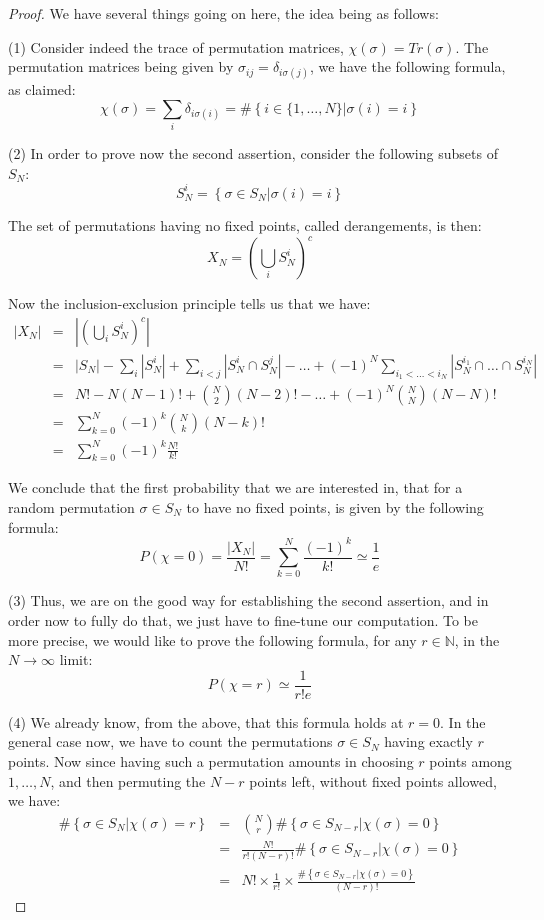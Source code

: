 \documentclass[12pt]{amsbook}
\begin{document}
\begin{proof}
We have several things going on here, the idea being as follows:

\medskip

(1) Consider indeed the trace of permutation matrices, $\chi(\sigma)=Tr(\sigma)$. The permutation matrices being given by $\sigma_{ij}=\delta_{i\sigma(j)}$, we have the following formula, as claimed:
$$\chi(\sigma)
=\sum_i\delta_{i\sigma(i)}
=\#\left\{i\in\{1,\ldots,N\}\Big|\sigma(i)=i\right\}$$

(2) In order to prove now the second assertion, consider the following subsets of $S_N$:
$$S_N^i=\left\{\sigma\in S_N\Big|\sigma(i)=i\right\}$$

The set of permutations having no fixed points, called derangements, is then:
$$X_N=\left(\bigcup_iS_N^i\right)^c$$

Now the inclusion-exclusion principle tells us that we have:
\begin{eqnarray*}
|X_N|
&=&\left|\left(\bigcup_iS_N^i\right)^c\right|\\
&=&|S_N|-\sum_i|S_N^i|+\sum_{i<j}|S_N^i\cap S_N^j|-\ldots+(-1)^N\sum_{i_1<\ldots<i_N}|S_N^{i_1}\cap\ldots\cap S_N^{i_N}|\\
&=&N!-N(N-1)!+\binom{N}{2}(N-2)!-\ldots+(-1)^N\binom{N}{N}(N-N)!\\
&=&\sum_{k=0}^N(-1)^k\binom{N}{k}(N-k)!\\
&=&\sum_{k=0}^N(-1)^k\frac{N!}{k!}
\end{eqnarray*}

We conclude that the first probability that we are interested in, that for a random permutation $\sigma\in S_N$ to have no fixed points, is given by the following formula:
$$P(\chi=0)
=\frac{|X_N|}{N!}
=\sum_{k=0}^N\frac{(-1)^k}{k!}\simeq\frac{1}{e}$$

(3) Thus, we are on the good way for establishing the second assertion, and in order now to fully do that, we just have to fine-tune our computation. To be more precise, we would like to prove the following formula, for any $r\in\mathbb N$, in the $N\to\infty$ limit:
$$P(\chi=r)\simeq\frac{1}{r!e}$$

(4) We already know, from the above, that this formula holds at $r=0$. In the general case now, we have to count the permutations $\sigma\in S_N$ having exactly $r$ points. Now since having such a permutation amounts in choosing $r$ points among $1,\ldots,N$, and then permuting the $N-r$ points left, without fixed points allowed, we have:
\begin{eqnarray*}
\#\left\{\sigma\in S_N\Big|\chi(\sigma)=r\right\}
&=&\binom{N}{r}\#\left\{\sigma\in S_{N-r}\Big|\chi(\sigma)=0\right\}\\
&=&\frac{N!}{r!(N-r)!}\#\left\{\sigma\in S_{N-r}\Big|\chi(\sigma)=0\right\}\\
&=&N!\times\frac{1}{r!}\times\frac{\#\left\{\sigma\in S_{N-r}\Big|\chi(\sigma)=0\right\}}{(N-r)!}
\end{eqnarray*}


\end{proof}
\end{document}
